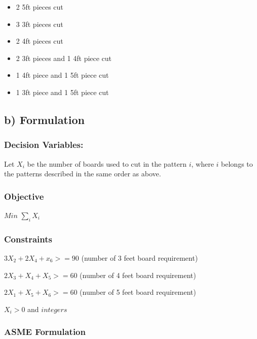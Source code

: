 \documentclass[]{article}
\providecommand{\tightlist}{%
  \setlength{\itemsep}{0pt}\setlength{\parskip}{0pt}}
\begin{document}
\begin{itemize}
\tightlist
\item
  2 5ft pieces cut
\item
  3 3ft pieces cut
\item
  2 4ft pieces cut
\item
  2 3ft pieces and 1 4ft piece cut
\item
  1 4ft piece and 1 5ft piece cut
\item
  1 3ft piece and 1 5ft piece cut
\end{itemize}

\subsection{b) Formulation}\label{b-formulation}

\subsubsection{Decision Variables:}\label{decision-variables-4}

Let \(X_{i}\) be the number of boards used to cut in the pattern \(i\),
where \(i\) belongs to the patterns described in the same order as
above.

\subsubsection{Objective}\label{objective}

\(Min\) \(\sum_{i} X_{i}\)

\subsubsection{Constraints}\label{constraints-2}

\(3X_{2} + 2X_{4} + x_{6} >= 90\) (number of 3 feet board requirement)

\(2X_{3} + X_{4} + X_{5} >= 60\) (number of 4 feet board requirement)

\(2X_{1} + X_{5} + X_{6} >= 60\) (number of 5 feet board requirement)

\(X_{i} > 0\) and \(integers\)

\subsubsection{ASME Formulation}\label{asme-formulation}
\end{document}
